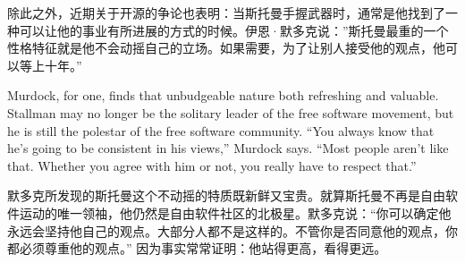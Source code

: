 \ifdefined\chs
除此之外，近期关于开源的争论也表明：当斯托曼手握武器时，通常是他找到了一种可以让他的事业有所进展的方式的时候。伊恩·默多克说：”斯托曼最重的一个性格特征就是他不会动摇自己的立场。如果需要，为了让别人接受他的观点，他可以等上十年。”
\fi

\ifdefined\eng
Murdock, for one, finds that unbudgeable nature both refreshing and valuable. Stallman may no longer be the solitary leader of the free software movement, but he is still the polestar of the free software community. ``You always know that he's going to be consistent in his views,'' Murdock says. ``Most people aren't like that. Whether you agree with him or not, you really have to respect that.''
\fi

\ifdefined\chs
默多克所发现的斯托曼这个不动摇的特质既新鲜又宝贵。就算斯托曼不再是自由软件运动的唯一领袖，他仍然是自由软件社区的北极星。默多克说：“你可以确定他永远会坚持他自己的观点。大部分人都不是这样的。不管你是否同意他的观点，你都必须尊重他的观点。” 因为事实常常证明：他站得更高，看得更远。
\fi

\theendnotes
\setcounter{endnote}{0}
